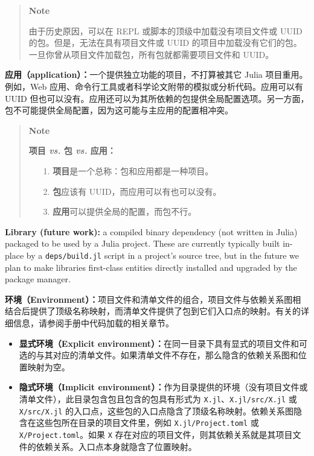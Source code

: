 \begin{quote}
\textbf{Note}

由于历史原因，可以在 REPL 或脚本的顶级中加载没有项目文件或 UUID 的包。但是，无法在具有项目文件或 UUID 的项目中加载没有它们的包。一旦你曾从项目文件加载包，所有包就都需要项目文件和 UUID。

\end{quote}


\textbf{应用（application）：}一个提供独立功能的项目，不打算被其它 Julia 项目重用。例如，Web 应用、命令行工具或者科学论文附带的模拟或分析代码。应用可以有 UUID 但也可以没有。应用还可以为其所依赖的包提供全局配置选项。另一方面，包不可能提供全局配置，因为这可能与主应用的配置相冲突。



\begin{quote}
\textbf{Note}

\textbf{项目 \emph{vs.} 包 \emph{vs.} 应用：}

\begin{itemize}
\item[1. ] \textbf{项目}是一个总称：包和应用都是一种项目。


\item[2. ] \textbf{包}应该有 UUID，而应用可以有也可以没有。


\item[3. ] \textbf{应用}可以提供全局的配置，而包不行。

\end{itemize}
\end{quote}


\textbf{Library (future work):} a compiled binary dependency (not written in Julia) packaged to be used by a Julia project. These are currently typically built in- place by a \texttt{deps/build.jl} script in a project’s source tree, but in the future we plan to make libraries first-class entities directly installed and upgraded by the package manager.



\textbf{环境（Environment）：}项目文件和清单文件的组合，项目文件与依赖关系图相结合后提供了顶级名称映射，而清单文件提供了包到它们入口点的映射。有关的详细信息，请参阅手册中代码加载的相关章节。



\begin{itemize}
\item \textbf{显式环境（Explicit environment）：}在同一目录下具有显式的项目文件和可选的与其对应的清单文件。如果清单文件不存在，那么隐含的依赖关系图和位置映射为空。


\item \textbf{隐式环境（Implicit environment）：}作为目录提供的环境（没有项目文件或清单文件），此目录包含包且包含的包具有形式为 \texttt{X.jl}、\texttt{X.jl/src/X.jl} 或 \texttt{X/src/X.jl} 的入口点，这些包的入口点隐含了顶级名称映射。依赖关系图隐含在这些包所在目录的项目文件里，例如 \texttt{X.jl/Project.toml} 或 \texttt{X/Project.toml}。如果 \texttt{X} 存在对应的项目文件，则其依赖关系就是其项目文件的依赖关系。入口点本身就隐含了位置映射。

\end{itemize}


